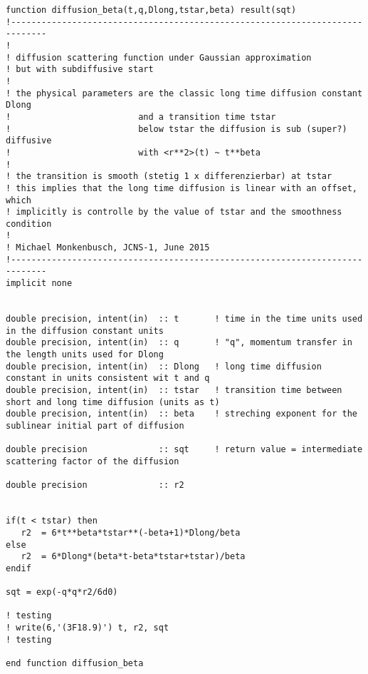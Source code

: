 \documentclass[12pt]{article}
\begin{document}
\hline
\tiny
\begin{verbatim}
function diffusion_beta(t,q,Dlong,tstar,beta) result(sqt)
!-----------------------------------------------------------------------------
!
! diffusion scattering function under Gaussian approximation
! but with subdiffusive start
! 
! the physical parameters are the classic long time diffusion constant Dlong
!                         and a transition time tstar
!                         below tstar the diffusion is sub (super?) diffusive 
!                         with <r**2>(t) ~ t**beta
!
! the transition is smooth (stetig 1 x differenzierbar) at tstar
! this implies that the long time diffusion is linear with an offset, which
! implicitly is controlle by the value of tstar and the smoothness condition
!
! Michael Monkenbusch, JCNS-1, June 2015
!-----------------------------------------------------------------------------
implicit none
 

double precision, intent(in)  :: t       ! time in the time units used in the diffusion constant units
double precision, intent(in)  :: q       ! "q", momentum transfer in the length units used for Dlong
double precision, intent(in)  :: Dlong   ! long time diffusion constant in units consistent wit t and q
double precision, intent(in)  :: tstar   ! transition time between short and long time diffusion (units as t)
double precision, intent(in)  :: beta    ! streching exponent for the sublinear initial part of diffusion

double precision              :: sqt     ! return value = intermediate scattering factor of the diffusion

double precision              :: r2


if(t < tstar) then
   r2  = 6*t**beta*tstar**(-beta+1)*Dlong/beta
else
   r2  = 6*Dlong*(beta*t-beta*tstar+tstar)/beta
endif

sqt = exp(-q*q*r2/6d0) 

! testing
! write(6,'(3F18.9)') t, r2, sqt
! testing

end function diffusion_beta 
\end{verbatim}
\normalsize
\end{document}
